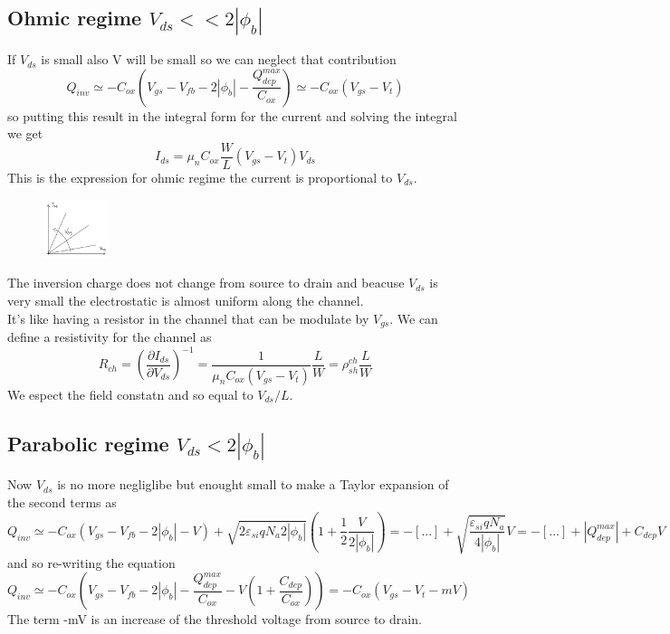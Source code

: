 \subsection{Ohmic regime $V_{ds}<<2|\phi_b|$}

If $V_{ds}$ is small also V will be small so we can neglect that contribution 
\begin{equation}
Q_{inv}\simeq -C_{ox}(V_{gs}-V_{fb}-2|\phi_b|-\frac{Q_{dep}^{max}}{C_{ox}})\simeq -C_{ox}(V_{gs}-V_t)
\end{equation}
so putting this result in the integral form for the current and solving the integral we get
\begin{equation}
I_{ds}=\mu_nC_{ox}\frac{W}{L}(V_{gs}-V_t)V_{ds}
\end{equation}
This is the expression for ohmic regime the current is proportional to $V_{ds}$.\\
\begin{figure}
\includegraphics[width=0.17\textwidth]{ohmreg.png}
\end{figure}

The inversion charge does not change from source to drain and beacuse $V_{ds}$ is very small the electrostatic is almost uniform along the channel.\\

It's like having a resistor in the channel that can be modulate by $V_{gs}$. We can define a resistivity for the channel as 
\begin{equation}
R_{ch}=(\frac{\partial I_{ds}}{\partial V_{ds}})^{-1}=\frac{1}{\mu_nC_{ox}(V_{gs}-V_{t})}\frac{L}{W}=\rho_{sh}^{ch}\frac{L}{W}
\end{equation}
We espect the field constatn and so equal to $V_{ds}/L$.\\


\subsection{Parabolic regime $V_{ds}<2|\phi_b|$}
Now $V_{ds}$ is no more negliglibe but enought small to make a Taylor expansion of the second terms as
\begin{equation}
Q_{inv}\simeq -C_{ox}(V_{gs}-V_{fb}-2|\phi_b|-V)+\sqrt{2\varepsilon_{si}qN_a2|\phi_b|}(1+\frac{1}{2}\frac{V}{2|\phi_b|})=-[...]+\sqrt{\frac{\varepsilon_{si}qN_a}{4|\phi_b|}}V=-[...]+|Q_{dep}^{max}|+C_{dep}V
\end{equation}
and so re-writing the equation
\begin{equation}
Q_{inv}\simeq-C_{ox}(V_{gs}-V_{fb}-2|\phi_b|-\frac{Q_{dep}^{max}}{C_{ox}}-V(1+\frac{C_{dep}}{C_{ox}}))=-C_{ox}(V_{gs}-V_t-mV)
\end{equation}
The term -mV is an increase of the threshold voltage from source to drain.\\


